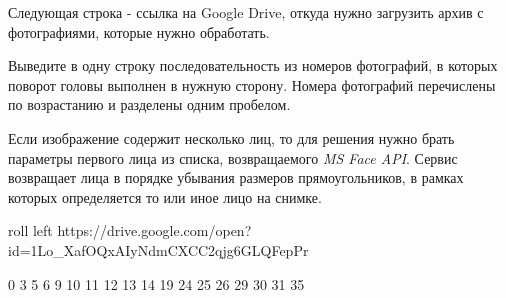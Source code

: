Следующая строка - ссылка на Google Drive, откуда нужно загрузить архив с фотографиями, которые нужно обработать.

\outputfmtSection

Выведите в одну строку последовательность из номеров фотографий, в которых поворот головы выполнен в нужную сторону. Номера фотографий перечислены по возрастанию и разделены одним пробелом.

\commentsSection
Если изображение содержит несколько лиц, то для решения нужно брать параметры первого лица из списка, возвращаемого \textit{MS Face API}. Сервис возвращает лица в порядке убывания размеров прямоугольников, в рамках которых определяется то или иное лицо на снимке.

\exampleSection


\begin{myverbbox}[\small]{\vinput}
roll left
https://drive.google.com/open?id=1Lo_XafOQxAIyNdmCXCC2qjg6GLQFepPr
\end{myverbbox}
\begin{myverbbox}[\small]{\voutput}
0 3 5 6 9 10 11 12 13 14 19 24 25 26 29 30 31 35
\end{myverbbox}


